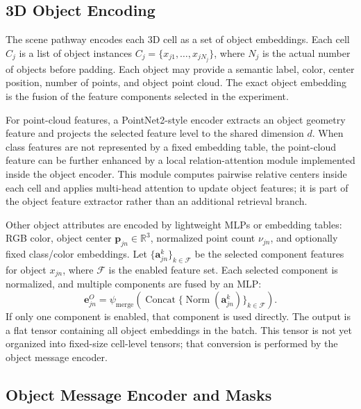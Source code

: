 \documentclass{article}
\begin{document}
\subsection{3D Object Encoding}

The scene pathway encodes each 3D cell as a set of object embeddings. Each cell $C_j$ is a list of object instances $C_j=\{x_{j1},\ldots,x_{jN_j}\}$, where $N_j$ is the actual number of objects before padding. Each object may provide a semantic label, color, center position, number of points, and object point cloud. The exact object embedding is the fusion of the feature components selected in the experiment.

For point-cloud features, a PointNet2-style encoder extracts an object geometry feature and projects the selected feature level to the shared dimension $d$. When class features are not represented by a fixed embedding table, the point-cloud feature can be further enhanced by a local relation-attention module implemented inside the object encoder. This module computes pairwise relative centers inside each cell and applies multi-head attention to update object features; it is part of the object feature extractor rather than an additional retrieval branch.

Other object attributes are encoded by lightweight MLPs or embedding tables: RGB color, object center $\mathbf{p}_{jn}\in\mathbb{R}^{3}$, normalized point count $\nu_{jn}$, and optionally fixed class/color embeddings. Let $\{\mathbf{a}_{jn}^{k}\}_{k\in\mathcal{F}}$ be the selected component features for object $x_{jn}$, where $\mathcal{F}$ is the enabled feature set. Each selected component is normalized, and multiple components are fused by an MLP:
\begin{equation}
\mathbf{e}^{O}_{jn}=\psi_{\mathrm{merge}}\left(\operatorname{Concat}\{\operatorname{Norm}(\mathbf{a}_{jn}^{k})\}_{k\in\mathcal{F}}\right).
\end{equation}
If only one component is enabled, that component is used directly. The output is a flat tensor containing all object embeddings in the batch. This tensor is not yet organized into fixed-size cell-level tensors; that conversion is performed by the object message encoder.

\subsection{Object Message Encoder and Masks}
\end{document}
